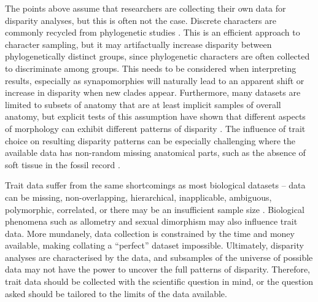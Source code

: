 \documentclass[12pt,letterpaper]{article}
\begin{document}
The points above assume that researchers are collecting their own data for disparity analyses, but this is often not the case.
Discrete characters are commonly recycled from phylogenetic studies \citep[e.g.][]{Brusatte2008,Close2015}.
This is an efficient approach to character sampling, but it may artifactually increase disparity between phylogenetically distinct groups, since phylogenetic characters are often collected to discriminate among groups.
This needs to be considered when interpreting results, especially as synapomorphies will naturally lead to an apparent shift or increase in disparity when new clades appear.
Furthermore, many datasets are limited to subsets of anatomy that are at least implicit samples of overall anatomy, but explicit tests of this assumption have shown that different aspects of morphology can exhibit different patterns of disparity \citep{Hopkins2017}.
The influence of trait choice on resulting disparity patterns can be especially challenging where the available data has non-random missing anatomical parts, such as the absence of soft tissue in the fossil record \citep{Deline2018}.

Trait data suffer from the same shortcomings as most biological datasets -- data can be missing, non-overlapping, hierarchical, inapplicable, ambiguous, polymorphic, correlated, or there may be an insufficient sample size \citep{Palci2018}.
Biological phenomena such as allometry and sexual dimorphism may also influence trait data.
More mundanely, data collection is constrained by the time and money available, making collating a ``perfect'' dataset impossible.
Ultimately, disparity analyses are characterised by the data, and subsamples of the universe of possible data may not have the power to uncover the full patterns of disparity.
Therefore, trait data should be collected with the scientific question in mind, or the question asked should be tailored to the limits of the data available.
\end{document}
